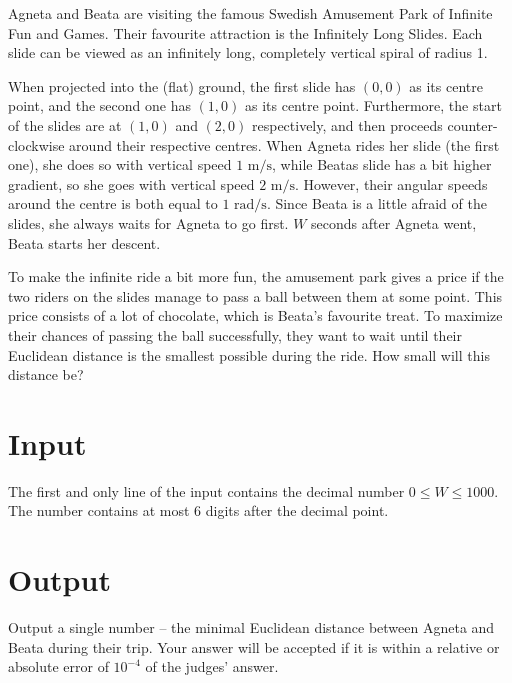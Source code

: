 Agneta and Beata are visiting the famous Swedish Amusement Park of Infinite Fun and Games.
Their favourite attraction is the Infinitely Long Slides.
Each slide can be viewed as an infinitely long, completely vertical spiral of radius 1.

When projected into the (flat) ground, the first slide has $(0, 0)$ as its centre point, and the second one has $(1, 0)$ as its centre point.
Furthermore, the start of the slides are at $(1, 0)$ and $(2, 0)$ respectively, and then proceeds counter-clockwise around their respective centres.
When Agneta rides her slide (the first one), she does so with vertical speed $1\text{ m/s}$, while Beatas slide has a bit higher gradient, so she goes with vertical speed $2\text{ m/s}$.
However, their angular speeds around the centre is both equal to $1 \text{ rad/s}$.
Since Beata is a little afraid of the slides, she always waits for Agneta to go first.
$W$ seconds after Agneta went, Beata starts her descent.

To make the infinite ride a bit more fun, the amusement park gives a price if the two riders on the slides manage to pass a ball between them at some point.
This price consists of a lot of chocolate, which is Beata's favourite treat.
To maximize their chances of passing the ball successfully, they want to wait until their Euclidean distance is the smallest possible during the ride.
How small will this distance be?

\section*{Input}
The first and only line of the input contains the decimal number $0 \le W \le 1000$.
The number contains at most 6 digits after the decimal point.

\section*{Output}
Output a single number -- the minimal Euclidean distance between Agneta and Beata during their trip.
Your answer will be accepted if it is within a relative or absolute error of $10^{-4}$ of the judges' answer.
